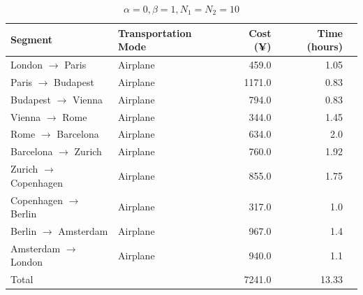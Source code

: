 \documentclass{article}
\begin{document}
\begin{table}[!ht]
  \centering
  \begin{tabular}{llrrr}
    \toprule
    Segment                          & Transportation Mode & Cost (¥) & Time (hours) \\
    \midrule
    London $\rightarrow$  Paris      & Airplane            & 459.0    & 1.05         \\
    Paris $\rightarrow$  Budapest    & Airplane            & 1171.0   & 0.83         \\
    Budapest $\rightarrow$  Vienna   & Airplane            & 794.0    & 0.83         \\
    Vienna $\rightarrow$  Rome       & Airplane            & 344.0    & 1.45         \\
    Rome $\rightarrow$  Barcelona    & Airplane            & 634.0    & 2.0          \\
    Barcelona $\rightarrow$  Zurich  & Airplane            & 760.0    & 1.92         \\
    Zurich $\rightarrow$  Copenhagen & Airplane            & 855.0    & 1.75         \\
    Copenhagen $\rightarrow$  Berlin & Airplane            & 317.0    & 1.0          \\
    Berlin $\rightarrow$  Amsterdam  & Airplane            & 967.0    & 1.4          \\
    Amsterdam $\rightarrow$  London  & Airplane            & 940.0    & 1.1          \\
    \midrule
    Total                            &                     & 7241.0   & 13.33        \\
    \bottomrule
  \end{tabular}
  \caption{$\alpha=0, \beta=1, N_1=N_2=10$}%
  \label{tab:alpha0beta1}
\end{table}
\end{document}
